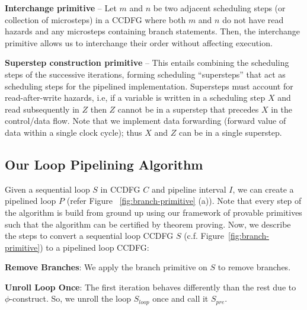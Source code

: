 {\textbf {Interchange primitive}} -- Let $m$ and $n$ be two adjacent scheduling steps (or collection of microsteps) in a CCDFG where both $m$ and $n$ do not have read hazards and any microsteps containing branch statements. Then, the interchange primitive allows us to interchange their order without affecting execution. 

{\textbf {Superstep construction primitive}} -- This entails combining the scheduling steps of the successive
iterations, forming scheduling ``supersteps'' that act as scheduling steps for the pipelined implementation. Supersteps must
account for read-after-write hazards, i.e, if a variable is written in a scheduling step $X$ and read subsequently in
$Z$ then $Z$ cannot be in a superstep that precedes $X$ in the control/data flow.  Note that we implement data
forwarding (forward value of data within a single clock cycle); thus $X$ and $Z$ can be in a single superstep.

\subsection{Our Loop Pipelining Algorithm}

Given a sequential loop $S$ in CCDFG $C$ and pipeline interval $I$, we can create a pipelined loop $P$ (refer Figure ~\ref{fig:branch-primitive} (a)). Note that every step of the algorithm is build from ground up using our framework of provable primitives such that the algorithm can be certified by theorem proving. Now, we describe the steps to convert a sequential loop CCDFG $S$ (c.f. Figure~\ref{fig:branch-primitive}) to a pipelined loop CCDFG:


{\bf Remove Branches}: We apply the branch primitive on $S$ to remove branches. 

{\bf Unroll Loop Once}: The first iteration behaves differently than the rest due to $\phi$-construct. So, we unroll the loop $S_{loop}$ once and call it $S_{pre}$. 

